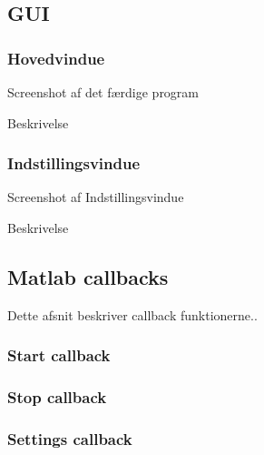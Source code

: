 \newpage
\subsection{GUI}
\subsubsection{Hovedvindue}
Screenshot af det færdige program

Beskrivelse
\subsubsection{Indstillingsvindue}
Screenshot af Indstillingsvindue

Beskrivelse

\newpage
\subsection{Matlab callbacks}
Dette afsnit beskriver callback funktionerne..
\subsubsection{Start callback}

\subsubsection{Stop callback}

\subsubsection{Settings callback}